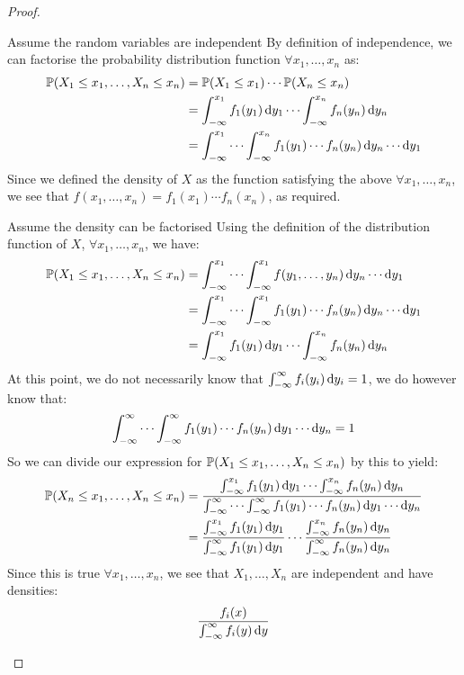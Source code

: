 \documentclass[../main.tex]{subfiles}
\begin{document}
\begin{proof}
  \begin{proofdirection}{Assume the random variables are independent}
    By definition of independence, we can factorise the probability distribution function $\forall x_1, \ldots, x_n$ as:
    \begin{align*}
      \P(X_1 \leq x_1, \ldots, X_n \leq x_n) &= \P(X_1 \leq x_1) \cdots \P(X_n \leq x_n) \\
                                             &= \int_{-\infty}^{x_1} f_1(y_1) \d{y_1} \cdots \int_{-\infty}^{x_n} f_n(y_n) \d{y_n} \\
                                             &= \int_{-\infty}^{x_1} \cdots \int_{-\infty}^{x_n} f_1(y_1) \cdots f_n(y_n) \d{y_n} \cdots \d{y_1}
    \end{align*}
    Since we defined the density of $X$ as the function satisfying the above $\forall x_1, \ldots, x_n$, we see that $f(x_1, \ldots, x_n) = f_1(x_1) \cdots f_n(x_n)$, as required.
  \end{proofdirection}
  \begin{proofdirection}{Assume the density can be factorised}
    Using the definition of the distribution function of $X$, $\forall x_1, \ldots, x_n$, we have:
    \begin{align*}
      \P(X_1 \leq x_1, \ldots, X_n \leq x_n) &= \int_{-\infty}^{x_1} \cdots \int_{-\infty}^{x_1} f(y_1, \ldots, y_n) \d{y_n} \cdots \d{y_1} \\
                                             &= \int_{-\infty}^{x_1} \cdots \int_{-\infty}^{x_1} f_1(y_1) \cdots f_n(y_n) \d{y_n} \cdots \d{y_1} \\
                                             &= \int_{-\infty}^{x_1} f_1(y_1) \d{y_1} \cdots \int_{-\infty}^{x_n} f_n(y_n) \d{y_n}
    \end{align*}
    At this point, we do not necessarily know that $\int_{-\infty}^{\infty} f_i(y_i) \d{y_i} = 1$, we do however know that:
    \[
      \int_{-\infty}^{\infty} \cdots \int_{-\infty}^{\infty} f_1(y_1) \cdots f_n(y_n) \d{y_1} \cdots\d{y_n} = 1
    \]
    So we can divide our expression for $\P(X_1 \leq x_1, \ldots, X_n \leq x_n)$ by this to yield:
    \begin{align*}
      \P(X_n \leq x_1, \ldots, X_n \leq x_n) &= \frac{\int_{-\infty}^{x_1} f_1(y_1) \d{y_1} \cdots \int_{-\infty}^{x_n} f_n(y_n) \d{y_n}}{\int_{-\infty}^{\infty} \cdots \int_{-\infty}^{\infty} f_1(y_1) \cdots f_n(y_n) \d{y_1} \cdots\d{y_n}} \\
                                             &= \frac{\int_{-\infty}^{x_1} f_1(y_1) \d{y_1}}{\int_{-\infty}^{\infty} f_1(y_1) \d{y_1}} \cdots \frac{\int_{-\infty}^{x_n} f_n(y_n) \d{y_n}}{\int_{-\infty}^{\infty} f_n(y_n) \d{y_n}}
    \end{align*}
    Since this is true $\forall x_1, \ldots, x_n$, we see that $X_1, \ldots, X_n$ are independent and have densities:
    \[
      \frac{f_i(x)}{\int_{-\infty}^{\infty} f_i(y) \d{y}}
    \]
  \end{proofdirection}
\end{proof}
\end{document}
